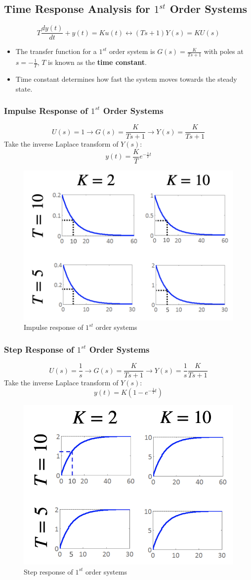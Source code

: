 \documentclass[12pt,a4paper]{article}
\begin{document}
\subsection{Time Response Analysis for $1^{st}$ Order Systems}
\[T\frac{dy(t)}{dt}+y(t)=Ku(t) \longleftrightarrow (Ts+1)Y(s)=KU(s)\]
\begin{itemize}
\item The transfer function for a $1^{st}$ order system is $G(s)=\frac{K}{Ts+1}$ with poles at $s=-\frac{1}{T}$,  $T$ is known as the \textbf{time constant}. 
\item Time constant determines how fast the system moves towards the steady state.
\end{itemize}

\subsubsection{Impulse Response of $1^{st}$ Order Systems}
\[U(s)=1 \longrightarrow \boxed{G(s)=\frac{K}{Ts+1}}\longrightarrow Y(s)= \frac{K}{Ts+1}\]
Take the inverse Laplace transform of $Y(s)$:
\[y(t) = \frac{K}{T}e^{-\frac{1}{T}t}\] 
\begin{figure}[H] \centering 
\includegraphics[width=.4\textwidth]{images/imp_res.png}
\caption{Impulse response of $1^{st}$ order systems}
\end{figure}

\subsubsection{Step Response of $1^{st}$ Order Systems}
\[U(s)=\frac{1}{s} \longrightarrow \boxed{G(s)=\frac{K}{Ts+1}} \longrightarrow Y(s)= \frac{1}{s}\frac{K}{Ts+1}\]
Take the inverse Laplace transform of $Y(s)$:
\[y(t) = K(1-e^{-\frac{1}{T}t})\]
\begin{figure}[H] \centering 
\includegraphics[width=.4\textwidth]{images/step_res.png}
\caption{Step response of $1^{st}$ order systems}
\end{figure}
\end{document}
